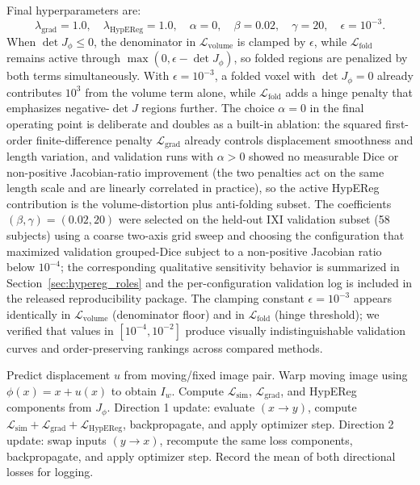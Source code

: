 \documentclass[jimaging,article,submit,pdftex,moreauthors]{Definitions/mdpi}
\begin{document}
Final hyperparameters are:
\[
\lambda_{\mathrm{grad}} = 1.0, \quad
\lambda_{\mathrm{HypEReg}} = 1.0, \quad
\alpha = 0, \quad
\beta = 0.02, \quad
\gamma = 20, \quad
\epsilon = 10^{-3}.
\]
When \(\det J_\phi \le 0\), the denominator in \(\mathcal{L}_{\mathrm{volume}}\) is clamped by \(\epsilon\), while \(\mathcal{L}_{\mathrm{fold}}\) remains active through \(\max(0,\epsilon-\det J_\phi)\), so folded regions are penalized by both terms simultaneously. With \(\epsilon=10^{-3}\), a folded voxel with \(\det J_\phi=0\) already contributes \(10^3\) from the volume term alone, while \(\mathcal{L}_{\mathrm{fold}}\) adds a hinge penalty that emphasizes negative-\(\det J\) regions further. The choice \(\alpha=0\) in the final operating point is deliberate and doubles as a built-in ablation: the squared first-order finite-difference penalty \(\mathcal{L}_{\mathrm{grad}}\) already controls displacement smoothness and length variation, and validation runs with \(\alpha>0\) showed no measurable Dice or non-positive Jacobian-ratio improvement (the two penalties act on the same length scale and are linearly correlated in practice), so the active HypEReg contribution is the volume-distortion plus anti-folding subset. The coefficients \((\beta,\gamma)=(0.02,20)\) were selected on the held-out IXI validation subset (58 subjects) using a coarse two-axis grid sweep and choosing the configuration that maximized validation grouped-Dice subject to a non-positive Jacobian ratio below \(10^{-4}\); the corresponding qualitative sensitivity behavior is summarized in Section~\ref{sec:hypereg_roles} and the per-configuration validation log is included in the released reproducibility package. The clamping constant \(\epsilon=10^{-3}\) appears identically in \(\mathcal{L}_{\mathrm{volume}}\) (denominator floor) and in \(\mathcal{L}_{\mathrm{fold}}\) (hinge threshold); we verified that values in \([10^{-4},10^{-2}]\) produce visually indistinguishable validation curves and order-preserving rankings across compared methods.

\begin{algorithm}[H]
\caption{HypEReg-TransMorph training step (per mini-batch)}
\begin{algorithmic}[1]
\State Predict displacement $u$ from moving/fixed image pair.
\State Warp moving image using $\phi(x)=x+u(x)$ to obtain $I_w$.
\State Compute $\mathcal{L}_{\mathrm{sim}}$, $\mathcal{L}_{\mathrm{grad}}$, and HypEReg components from $J_\phi$.
\State Direction 1 update: evaluate $(x\rightarrow y)$, compute $\mathcal{L}_{\mathrm{sim}}+\mathcal{L}_{\mathrm{grad}}+\mathcal{L}_{\mathrm{HypEReg}}$, backpropagate, and apply optimizer step.
\State Direction 2 update: swap inputs $(y\rightarrow x)$, recompute the same loss components, backpropagate, and apply optimizer step.
\State Record the mean of both directional losses for logging.
\end{algorithmic}
\end{algorithm}
\end{document}
